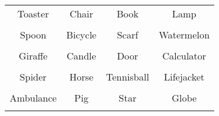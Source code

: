 \documentclass[12pt,a4paper]{article}
\begin{document}
\thispagestyle{empty}
\begin{table}[]
\centering
\Huge
\begin{tabular}{cccc}
 Toaster& Chair& Book& Lamp\\  & & & \\
 Spoon& Bicycle& Scarf& Watermelon\\  & & & \\
 Giraffe& Candle& Door& Calculator\\  & & & \\
 Spider& Horse& Tennisball& Lifejacket\\  & & & \\
 Ambulance& Pig& Star& Globe\\  & & & \\
\end{tabular}
\end{table}
\end{document}
